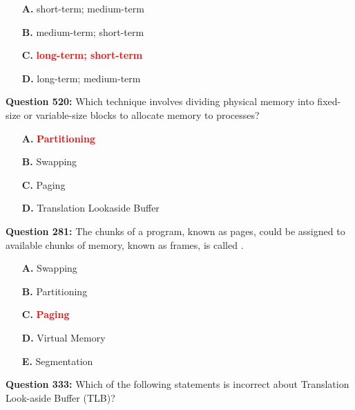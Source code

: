 \documentclass[12pt,a4paper]{article}
\begin{document}
\begin{itemize}
    \item[\textbf{A.}] short-term; medium-term
    \item[\textbf{B.}] medium-term; short-term
    \item[\textbf{C.}] \textcolor{red}{\textbf{long-term; short-term}}
    \item[\textbf{D.}] long-term; medium-term
\end{itemize}

\vspace{0.5cm}

\vspace{0.5cm}

\textbf{Question 520:} Which technique involves dividing physical memory into fixed-size or variable-size blocks to allocate memory to processes?

\begin{itemize}
    \item[\textbf{A.}] \textcolor{red}{\textbf{Partitioning}}
    \item[\textbf{B.}] Swapping
    \item[\textbf{C.}] Paging
    \item[\textbf{D.}] Translation Lookaside Buffer
\end{itemize}

\vspace{0.5cm}

\vspace{0.5cm}

\textbf{Question 281:} The chunks of a program, known as pages, could be assigned to available chunks of memory, known as frames, is called \underline{\hspace{1.5cm}}.

\begin{itemize}
    \item[\textbf{A.}] Swapping
    \item[\textbf{B.}] Partitioning
    \item[\textbf{C.}] \textcolor{red}{\textbf{Paging}}
    \item[\textbf{D.}] Virtual Memory
    \item[\textbf{E.}] Segmentation
\end{itemize}

\vspace{0.5cm}

\vspace{0.5cm}

\textbf{Question 333:} Which of the following statements is incorrect about Translation Look-aside Buffer (TLB)?
\end{document}
